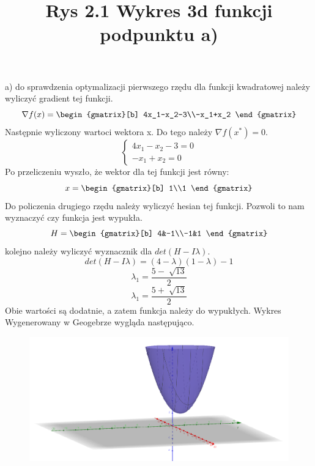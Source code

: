 \documentclass{article}
\begin{document}
a) do sprawdzenia optymalizacji pierwszego rzędu dla funkcji kwadratowej należy wyliczyć gradient tej funkcji.
\begin{equation}
  \nabla f(x) =
  \begin{gmatrix}[b]
    4x_1-x_2-3\\-x_1+x_2
  \end{gmatrix}
\end{equation}
Następnie wyliczony wartoci wektora x. Do tego należy $\nabla f(x^*)=0$.
\begin{equation}
    \begin{cases}
      4x_1-x_2-3=0\\
      -x_1+x_2=0
    \end{cases}
\end{equation}
Po przeliczeniu wyszło, że wektor dla tej funkcji jest równy:
\begin{equation}
  x=\begin{gmatrix}[b]
    1\\1
  \end{gmatrix}
\end{equation}
Do policzenia drugiego rzędu należy wyliczyć hesian tej funkcji. Pozwoli to nam wyznaczyć czy funkcja jest wypukła.
\begin{equation}
  H= 
  \begin{gmatrix}[b]
    4&-1\\-1&1
  \end{gmatrix}
\end{equation}
kolejno należy wyliczyć wyznacznik dla $det(H-I\lambda)$.
\begin{equation}
  det(H-I\lambda) = (4-\lambda)(1-\lambda)-1
\end{equation}
\begin{equation}
  \lambda_1 = \frac{5-\sqrt[]{13}}{2}
\end{equation}
\begin{equation}
  \lambda_1 = \frac{5+\sqrt[]{13}}{2}
\end{equation}
Obie wartości są dodatnie, a zatem funkcja należy do wypukłych. Wykres Wygenerowany w Geogebrze wygląda następująco.
\begin{figure}[h]
  \includegraphics[scale=0.4]{Zadanie2a-wykres.png}
  \title{Rys 2.1 Wykres 3d funkcji podpunktu a)}
  \centering
\end{figure}
\end{document}
